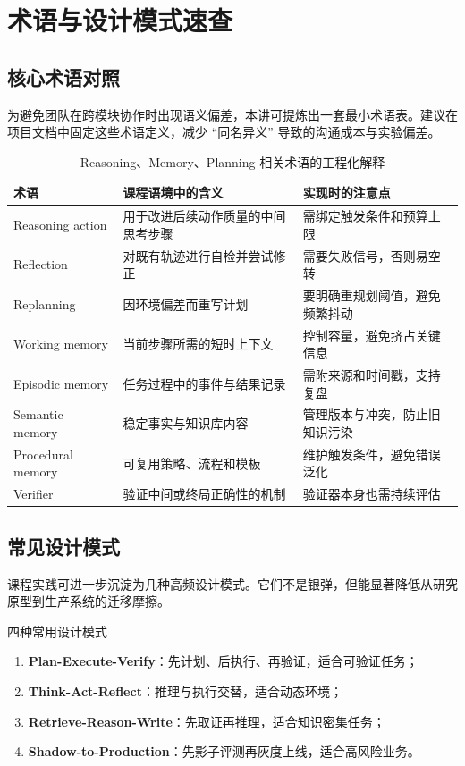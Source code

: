 \section{术语与设计模式速查}

\subsection{核心术语对照}
为避免团队在跨模块协作时出现语义偏差，本讲可提炼出一套最小术语表。建议在项目文档中固定这些术语定义，减少 ``同名异义'' 导致的沟通成本与实验偏差。

\begin{table}[H]
\centering
\begin{tabular}{p{2.8cm}p{3.6cm}p{4.1cm}}
\toprule
\textbf{术语} & \textbf{课程语境中的含义} & \textbf{实现时的注意点} \\
\midrule
Reasoning action & 用于改进后续动作质量的中间思考步骤 & 需绑定触发条件和预算上限 \\
Reflection & 对既有轨迹进行自检并尝试修正 & 需要失败信号，否则易空转 \\
Replanning & 因环境偏差而重写计划 & 要明确重规划阈值，避免频繁抖动 \\
Working memory & 当前步骤所需的短时上下文 & 控制容量，避免挤占关键信息 \\
Episodic memory & 任务过程中的事件与结果记录 & 需附来源和时间戳，支持复盘 \\
Semantic memory & 稳定事实与知识库内容 & 管理版本与冲突，防止旧知识污染 \\
Procedural memory & 可复用策略、流程和模板 & 维护触发条件，避免错误泛化 \\
Verifier & 验证中间或终局正确性的机制 & 验证器本身也需持续评估 \\
\bottomrule
\end{tabular}
\caption{Reasoning、Memory、Planning 相关术语的工程化解释}
\end{table}

\subsection{常见设计模式}
课程实践可进一步沉淀为几种高频设计模式。它们不是银弹，但能显著降低从研究原型到生产系统的迁移摩擦。

\begin{knowledgebox}{四种常用设计模式}
\begin{enumerate}
    \item \textbf{Plan-Execute-Verify}：先计划、后执行、再验证，适合可验证任务；
    \item \textbf{Think-Act-Reflect}：推理与执行交替，适合动态环境；
    \item \textbf{Retrieve-Reason-Write}：先取证再推理，适合知识密集任务；
    \item \textbf{Shadow-to-Production}：先影子评测再灰度上线，适合高风险业务。
\end{enumerate}
\end{knowledgebox}

